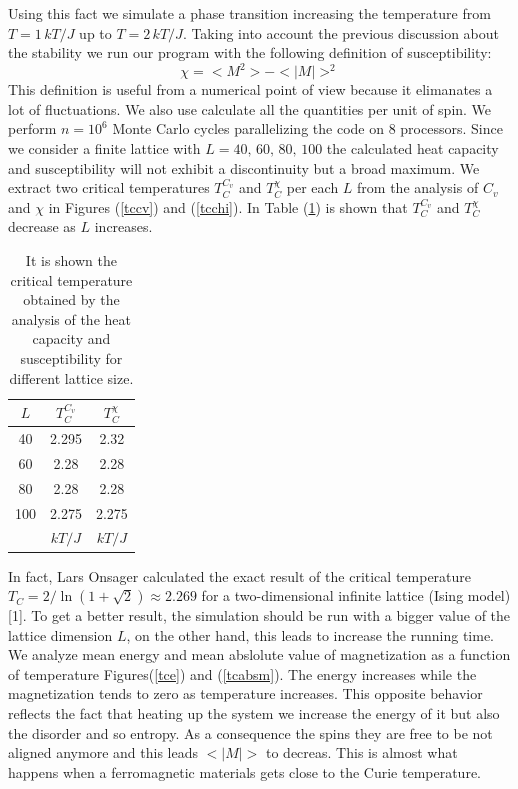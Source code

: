 \documentclass[%
preprint,
 amsmath,amssymb,
 aps,
]{revtex4-1}
\theoremstyle{plain}
\theoremstyle{definition}
\theoremstyle{plain}
\begin{document}
Using this fact we simulate a phase transition increasing the temperature from $T=1 \, kT/J$ up to $T=2 \, kT/J$. Taking into account the previous discussion about the stability we run our program with the following definition of susceptibility:
\begin{equation}
\chi = <M^2>-<|M|>^2
\end{equation}
This definition is useful from a numerical point of view because it elimanates a lot of fluctuations. We also use calculate all the quantities per unit of spin.
We perform $n=10^6$ Monte Carlo cycles parallelizing the code on $8$ processors. 
Since we consider a finite lattice with $L=40,\,60,\, 80,\,100$ the calculated heat capacity and susceptibility will not exhibit a discontinuity but a broad maximum. We extract two critical temperatures $T_C ^{C_v}$ and $T_C ^{\chi}$ per each $L$ from the analysis of $C_v$ and $\chi$ in Figures (\ref{tccv}) and (\ref{tcchi}).  In Table (\ref{critict}) is shown that $T_C ^{C_v}$ and $T_C ^{\chi}$ decrease as $L$ increases.
\begin{table}
\centering
\setlength{\tabcolsep}{12pt}
\caption{It is shown the critical temperature obtained by the analysis of the heat capacity and susceptibility for different lattice size.}
\label{critict}
\begin{tabular}{ccc}
\toprule
$L$ & $T_C ^{C_v}$ & $T_C ^{\chi}$ \\
\midrule
 40 &  2.295 & 2.32 \\
 60 &  2.28 & 2.28  \\
  80 & 2.28  & 2.28   \\
 100 &  2.275 & 2.275 \\
\bottomrule
 & $kT/J$ & $kT/J$ \\ 
\end{tabular}

\end{table} In fact, Lars Onsager calculated the exact result of the critical temperature $T_C = 2/\ln(1 + \sqrt{2}) \approx 2.269$ for a two-dimensional infinite lattice (Ising model)[1]. To get a better result, the simulation should be run with a bigger value of the lattice dimension $L$, on the other hand, this leads to increase the running time.
We analyze mean energy and mean abslolute value of magnetization as a function of temperature Figures(\ref{tce}) and (\ref{tcabsm}). The energy increases while the magnetization tends to zero  as temperature increases. This opposite behavior reflects the fact that heating up the system we increase the energy of it but also the disorder and so entropy. As a consequence the spins they are free to be not aligned anymore and this leads $<|M|>$ to decreas. This is almost what happens when a ferromagnetic materials gets close to the Curie temperature.
\end{document}
